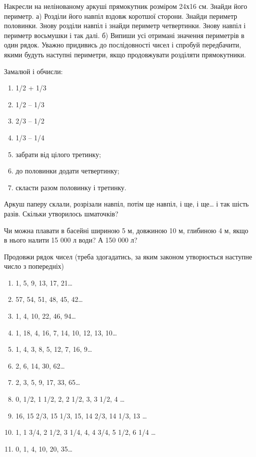 \problem
Накресли на нелінованому аркуші прямокутник розміром 24х16 см.
Знайди його периметр.
а) Розділи його навпіл вздовж коротшої сторони.
Знайди периметр половинки.
Знову розділи навпіл і знайди периметр четвертинки.
Знову навпіл і периметр восьмушки і так далі.
б) Випиши усі отримані значення периметрів в один рядок.
Уважно придивись до послідовності чисел і спробуй передбачити,
якими будуть наступні периметри, якщо продовжувати розділяти прямокутники.


\problem
Замалюй і обчисли:
\begin{multicols}{2}
    \begin{enumerate}
        \item 1/2 + 1/3 
        \item 1/2 – 1/3 
        \item 2/3 – 1/2 
        \item 1/3 – 1/4 
        \item забрати від цілого третинку;
        \item до половинки додати четвертинку;
        \item скласти разом половинку і третинку.
    \end{enumerate}
\end{multicols}


\problem
Аркуш паперу склали, розрізали навпіл, потім ще навпіл, і ще, і ще\ldots
і так шість разів.
Скільки утворилось шматочків?


\problem
Чи можна плавати в басейні шириною 5 м, довжиною 10 м, глибиною 4 м,
якщо в нього налити 15 000 л води? А 150 000 л?


\problem
Продовжи рядок чисел (треба здогадатись, за яким законом утворюється
наступне число з попередніх)
\begin{enumerate}
    \item 1, 5, 9, 13, 17, 21…
    \item 57, 54, 51, 48, 45, 42…
    \item 1, 4, 10, 22, 46, 94…
    \item 1, 18, 4, 16, 7, 14, 10, 12, 13, 10…
    \item 1, 4, 3, 8, 5, 12, 7, 16, 9…
    \item 2, 6, 14, 30, 62…
    \item 2, 3, 5, 9, 17, 33, 65…
    \item 0, 1/2, 1 1/2, 2, 2 1/2, 3, 3 1/2, 4 …
    \item 16, 15 2/3, 15 1/3, 15, 14 2/3, 14 1/3, 13 …
    \item 1, 1 3/4, 2 1/2, 3 1/4, 4, 4 3/4, 5 1/2, 6 1/4 …
    \item 0, 1, 4, 10, 20, 35… 
\end{enumerate}


